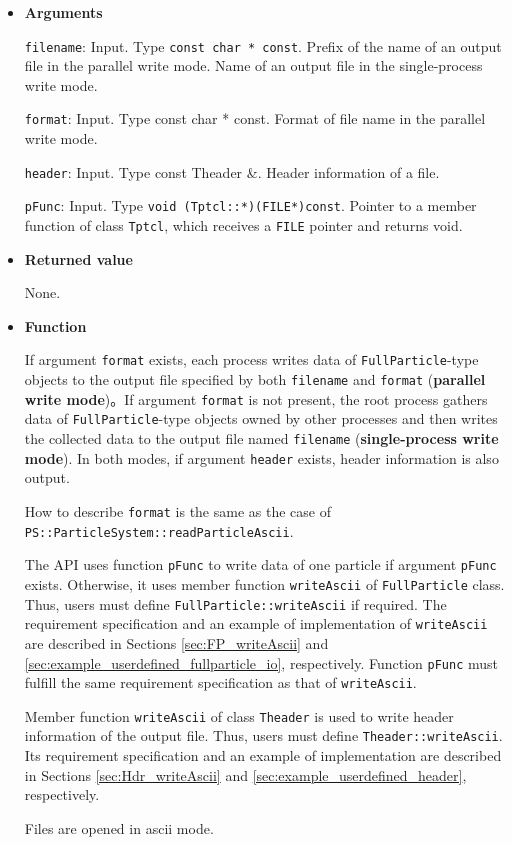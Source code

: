 \begin{itemize}

\item{{\bf Arguments}}

  \texttt{filename}: Input. Type \texttt{const char * const}. Prefix of the name of an output file in the parallel write mode. Name of an output file in the single-process write mode.

  \texttt{format}: Input. Type {const char * const}. Format of file name in the parallel write mode.

  \texttt{header}: Input. Type {const Theader \&}. Header information of a file.
  
  \texttt{pFunc}: Input. Type \texttt{void (Tptcl::*)(FILE*)const}. Pointer to a member function of class \texttt{Tptcl}, which receives a \texttt{FILE} pointer and returns void.

\item{{\bf Returned value}}

  None.

\item{{\bf Function}}

If argument \texttt{format} exists, each process writes data of \texttt{FullParticle}-type objects to the output file specified by both \texttt{filename} and \texttt{format} (\textbf{parallel write mode})。If argument \texttt{format} is not present, the root process gathers data of \texttt{FullParticle}-type objects owned by other processes and then writes the collected data to the output file named \texttt{filename} (\textbf{single-process write mode}). In both modes, if argument \texttt{header} exists, header information is also output.


How to describe \texttt{format} is the same as the case of \newline\texttt{PS::ParticleSystem::readParticleAscii}.
  
The API uses function \texttt{pFunc} to write data of one particle if argument \texttt{pFunc} exists. Otherwise, it uses member function \texttt{writeAscii} of \texttt{FullParticle} class. Thus, users must define \texttt{FullParticle::writeAscii} if required. The requirement specification and an example of implementation of \texttt{writeAscii} are described in Sections \ref{sec:FP_writeAscii} and \ref{sec:example_userdefined_fullparticle_io}, respectively. Function \texttt{pFunc} must fulfill the same requirement specification as that of \texttt{writeAscii}.


Member function \texttt{writeAscii} of class \texttt{Theader} is used to write header information of the output file. Thus, users must define \texttt{Theader::writeAscii}. Its requirement specification and an example of implementation are described in Sections \ref{sec:Hdr_writeAscii} and \ref{sec:example_userdefined_header}, respectively.

Files are opened in ascii mode.

\end{itemize}


